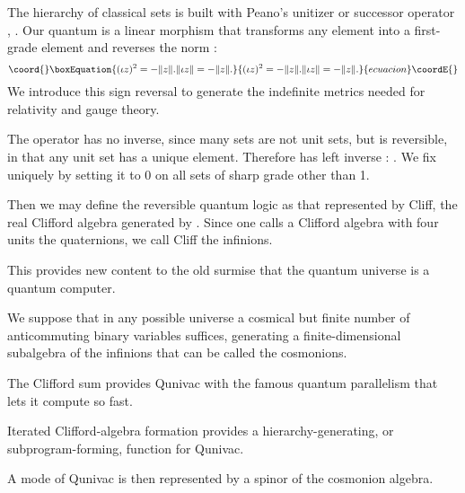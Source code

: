 \documentclass[a4paper,11pt]{article}
\def\2#1{\mbox{\bf #1}}
\def\5#1{\mbox{\sf #1}} %
\def\6#1{\mbox{\ssf #1}}
\begin{document}
The hierarchy of classical sets is built with
Peano's unitizer or successor operator \coordHE{},
\coordHE{}.
Our quantum \myHighlight{$\iota: C\to  {\22}^C$}\coordHE{}
is a linear morphism \myHighlight{$C\to {\22}^C$}\coordHE{}
that
transforms any element \coordHE{} into a
first-grade element \coordHE{}
and  reverses the  norm 
\coordHE{}:
\begin{equation}\coord{}\boxEquation{
 (\iota z)^2 =-\|z\|\/. \|\iota z\|=-\|z\|\/.
}{
 (\iota z)^2 =-\|z\|\/. \|\iota z\|=-\|z\|\/.
}{ecuacion}\coordE{}\end{equation}
We introduce this sign reversal to generate
the indefinite metrics needed 
for relativity and gauge theory.

The operator  \myHighlight{$\iota$}\coordHE{} has no inverse,
since many sets are not unit sets,
but \myHighlight{$\iota$}\coordHE{} is reversible, in that
any unit set has a unique element.
Therefore \myHighlight{$\iota$}\coordHE{} has left inverse \myHighlight{$\iota^{\6L}$}\coordHE{}:
\myHighlight{$\iota^{\6L}\iota=\5I\5d$}\coordHE{}.
We fix \myHighlight{$\iota^{\6L}$}\coordHE{} uniquely
by setting it to 0 on all sets of sharp grade
other than 1.

Then we may define the reversible quantum logic 
\coordHE{} as that represented by Cliff\myHighlight{$(\iota)$}\coordHE{},
the real Clifford algebra
generated by \myHighlight{$\iota$}\coordHE{}.
Since one calls a Clifford algebra with four units  the quaternions,
we call Cliff\myHighlight{$(\iota)$}\coordHE{} the infinions.

This provides new 
content
to the old surmise \cite{FINKELSTEIN1969}
that  the quantum universe is a quantum computer.

We suppose that in any possible universe
a cosmical but finite number
\coordHE{} of anticommuting
binary variables
suffices,
generating a finite-dimensional
subalgebra of the infinions
that can be called the cosmonions.

The Clifford sum provides  Qunivac 
with the famous quantum parallelism
that lets it compute so fast.

Iterated Clifford-algebra formation provides a
hierarchy-generating,
or  subprogram-forming,
function for Qunivac.

A mode of Qunivac is then represented by a  spinor
of the cosmonion algebra.
\end{document}
